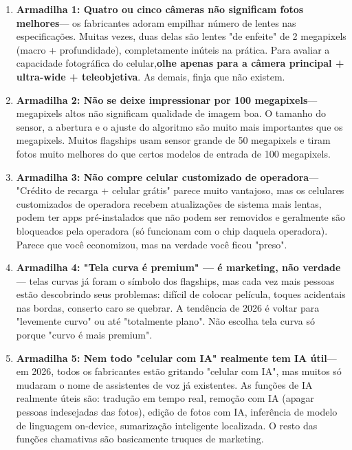 \begin{enumerate}
  \item \textbf{Armadilha 1: Quatro ou cinco câmeras não significam fotos melhores}— os fabricantes adoram empilhar número de lentes nas especificações. Muitas vezes, duas delas são lentes "de enfeite" de 2 megapixels (macro + profundidade), completamente inúteis na prática. Para avaliar a capacidade fotográfica do celular,\textbf{olhe apenas para a câmera principal + ultra-wide + teleobjetiva}. As demais, finja que não existem.
  \item \textbf{Armadilha 2: Não se deixe impressionar por 100 megapixels}— megapixels altos não significam qualidade de imagem boa. O tamanho do sensor, a abertura e o ajuste do algoritmo são muito mais importantes que os megapixels. Muitos flagships usam sensor grande de 50 megapixels e tiram fotos muito melhores do que certos modelos de entrada de 100 megapixels.
  \item \textbf{Armadilha 3: Não compre celular customizado de operadora}— "Crédito de recarga + celular grátis" parece muito vantajoso, mas os celulares customizados de operadora recebem atualizações de sistema mais lentas, podem ter apps pré-instalados que não podem ser removidos e geralmente são bloqueados pela operadora (só funcionam com o chip daquela operadora). Parece que você economizou, mas na verdade você ficou "preso".
  \item \textbf{Armadilha 4: "Tela curva é premium" — é marketing, não verdade}— telas curvas já foram o símbolo dos flagships, mas cada vez mais pessoas estão descobrindo seus problemas: difícil de colocar película, toques acidentais nas bordas, conserto caro se quebrar. A tendência de 2026 é voltar para "levemente curvo" ou até "totalmente plano". Não escolha tela curva só porque "curvo é mais premium".
  \item \textbf{Armadilha 5: Nem todo "celular com IA" realmente tem IA útil}— em 2026, todos os fabricantes estão gritando "celular com IA", mas muitos só mudaram o nome de assistentes de voz já existentes. As funções de IA realmente úteis são: tradução em tempo real, remoção com IA (apagar pessoas indesejadas das fotos), edição de fotos com IA, inferência de modelo de linguagem on-device, sumarização inteligente localizada. O resto das funções chamativas são basicamente truques de marketing.
\end{enumerate}


